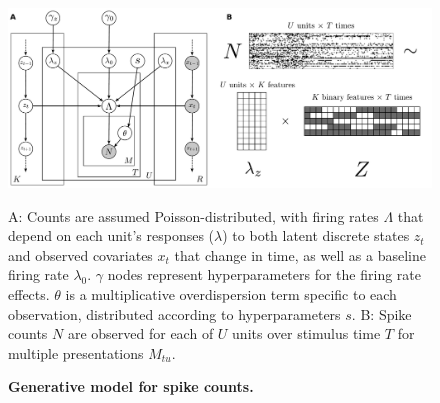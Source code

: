 \documentclass[12pt,a4paper]{article}
\begin{document}
\begin{figure}[!ht]
    \includegraphics[width=\linewidth]{figures/model}
	\caption{\bf Generative model for spike counts.}
	A: Counts are assumed Poisson-distributed, with firing rates $\Lambda$ that depend on each unit's responses ($\lambda$) to both latent discrete states $z_t$ and observed covariates $x_t$ that change in time, as well as a baseline firing rate $\lambda_0$. $\gamma$ nodes represent hyperparameters for the firing rate effects. $\theta$ is a multiplicative overdispersion term specific to each observation, distributed according to hyperparameters $s$. B: Spike counts $N$ are observed for each of $U$ units over stimulus time $T$ for multiple presentations $M_{tu}$.
\label{fig1}
\end{figure}
\end{document}
